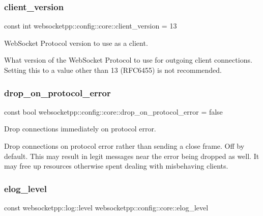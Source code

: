 \subsubsection{\texorpdfstring{client\+\_\+version}{client\_version}}
{\footnotesize\ttfamily const int websocketpp\+::config\+::core\+::client\+\_\+version = 13\hspace{0.3cm}{\ttfamily [static]}}



Web\+Socket Protocol version to use as a client. 

What version of the Web\+Socket Protocol to use for outgoing client connections. Setting this to a value other than 13 (R\+F\+C6455) is not recommended. \mbox{\label{structwebsocketpp_1_1config_1_1core_aa103c2e42ba4c43a34e918048b478890}} 
\subsubsection{\texorpdfstring{drop\+\_\+on\+\_\+protocol\+\_\+error}{drop\_on\_protocol\_error}}
{\footnotesize\ttfamily const bool websocketpp\+::config\+::core\+::drop\+\_\+on\+\_\+protocol\+\_\+error = false\hspace{0.3cm}{\ttfamily [static]}}



Drop connections immediately on protocol error. 

Drop connections on protocol error rather than sending a close frame. Off by default. This may result in legit messages near the error being dropped as well. It may free up resources otherwise spent dealing with misbehaving clients. \mbox{\label{structwebsocketpp_1_1config_1_1core_a31a33f2fdcf9cabf04995367ce473c77}} 
\subsubsection{\texorpdfstring{elog\+\_\+level}{elog\_level}}
{\footnotesize\ttfamily const websocketpp\+::log\+::level websocketpp\+::config\+::core\+::elog\+\_\+level\hspace{0.3cm}{\ttfamily [static]}}

